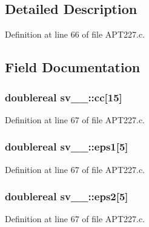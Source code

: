 \subsection{Detailed Description}


Definition at line 66 of file A\+P\+T227.\+c.



\subsection{Field Documentation}
\subsubsection[{\texorpdfstring{cc}{cc}}]{\setlength{\rightskip}{0pt plus 5cm}doublereal sv\+\_\+\_\+\+::cc\mbox{[}15\mbox{]}}\hypertarget{structsv__1___a4d829fa2396825085d8008ef846232d7}{}\label{structsv__1___a4d829fa2396825085d8008ef846232d7}


Definition at line 67 of file A\+P\+T227.\+c.

\subsubsection[{\texorpdfstring{eps1}{eps1}}]{\setlength{\rightskip}{0pt plus 5cm}doublereal sv\+\_\+\_\+\+::eps1\mbox{[}5\mbox{]}}\hypertarget{structsv__1___a36ba7c34fd6dec03e93f0f2ab10cbcf3}{}\label{structsv__1___a36ba7c34fd6dec03e93f0f2ab10cbcf3}


Definition at line 67 of file A\+P\+T227.\+c.

\subsubsection[{\texorpdfstring{eps2}{eps2}}]{\setlength{\rightskip}{0pt plus 5cm}doublereal sv\+\_\+\_\+\+::eps2\mbox{[}5\mbox{]}}\hypertarget{structsv__1___ac3ac592537e4af63c79d3e76866a4391}{}\label{structsv__1___ac3ac592537e4af63c79d3e76866a4391}


Definition at line 67 of file A\+P\+T227.\+c.

